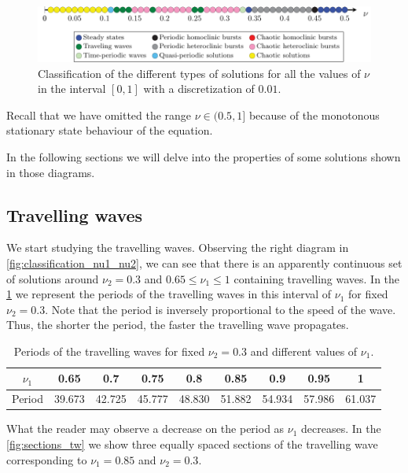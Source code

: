 \documentclass[twoside]{article}
\begin{document}
\begin{figure}[ht]
  \centering
  \includegraphics[width=\textwidth]{images/nu1=nu2.pdf}
  \caption{Classification of the different types of solutions for all the values of $\nu$ in the interval $[0,1]$ with a discretization of $0.01$.}
  \label{fig:classification_nu}
\end{figure}
Recall that we have omitted the range $\nu\in(0.5,1]$ because of the monotonous stationary state behaviour of the equation.

In the following sections we will delve into the properties of some solutions shown in those diagrams.
\subsection{Travelling waves}\label{sec:travelling_waves}
We start studying the travelling waves. Observing the right diagram in \cref{fig:classification_nu1_nu2}, we can see that there is an apparently continuous set of solutions around $\nu_2=0.3$ and $0.65\leq \nu_1\leq 1$ containing travelling waves. In the \cref{tab:travelling_waves} we represent the periods of the travelling waves in this interval of $\nu_1$ for fixed $\nu_2=0.3$. Note that the period is inversely proportional to the speed of the wave. Thus, the shorter the period, the faster the travelling wave propagates.

\begin{table}[ht]
  \centering
  \begin{tabular}{|c||cccccccc|}
    \hline
    $\nu_1$ & 0.65   & 0.7    & 0.75   & 0.8    & 0.85   & 0.9    & 0.95   & 1      \\ \hline
    Period  & 39.673 & 42.725 & 45.777 & 48.830 & 51.882 & 54.934 & 57.986 & 61.037 \\
    \hline
  \end{tabular}
  \caption{Periods of the travelling waves for fixed $\nu_2=0.3$ and different values of $\nu_1$.}
  \label{tab:travelling_waves}
\end{table}
What the reader may observe a decrease on the period as $\nu_1$ decreases. In the \cref{fig:sections_tw} we show three equally spaced sections of the travelling wave corresponding to $\nu_1=0.85$ and $\nu_2=0.3$.
\end{document}
